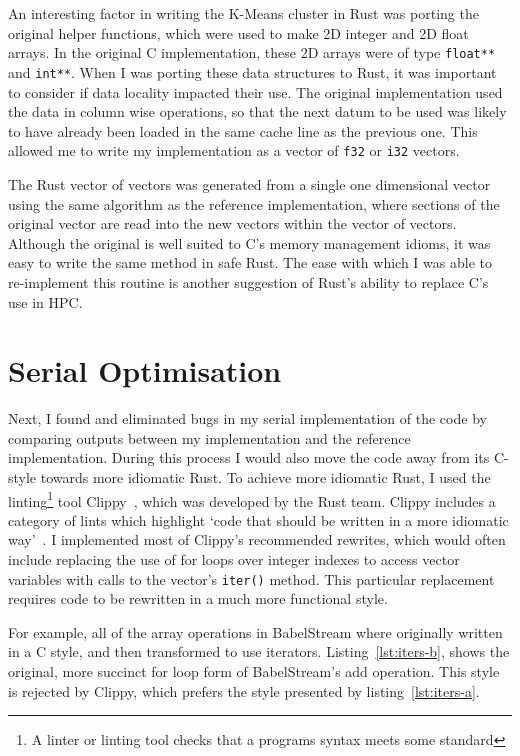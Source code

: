 An interesting factor in writing the K-Means cluster in Rust was porting the original helper functions, which were used to make 2D integer and 2D float arrays. In the original C implementation, these 2D arrays were of type \texttt{float**} and \texttt{int**}.
When I was porting these data structures to Rust, it was important to consider if data locality impacted their use. The original implementation used the data in column wise operations, so that the next datum to be used was likely to have already been loaded in the same cache line as the previous one. This allowed me to write my implementation as a vector of \texttt{f32} or \texttt{i32} vectors.

The Rust vector of vectors was generated from a single one dimensional vector using the same algorithm as the reference implementation, where sections of the original vector are read into the new vectors within the vector of vectors. Although the original is well suited to C's memory management idioms, it was easy to write the same method in safe Rust. The ease with which I was able to re-implement this routine is another suggestion of Rust's ability to replace C's use in HPC.

\section{Serial Optimisation}
Next, I found and eliminated bugs in my serial implementation of the code by comparing outputs between my implementation and the reference implementation. During this process I would also move the code away from its C-style towards more idiomatic Rust. To achieve more idiomatic Rust, I used the linting\footnote{A linter or linting tool checks that a programs syntax meets some standard} tool Clippy~\cite{RustClippy}, which was developed by the Rust team.  Clippy includes a category of lints  which highlight `code that should be written in a more idiomatic way'~\cite{RustClippy}. I implemented most of Clippy's recommended rewrites, which would often include replacing the use of for loops over integer indexes to access vector variables with calls to the vector's \texttt{iter()} method. This particular replacement requires code to be rewritten in a much more functional style.

For example, all of the array operations in BabelStream where originally written in a C style, and then transformed to use iterators. Listing~\ref{lst:iters-b}, shows the original, more succinct for loop form of BabelStream's add operation. This style is rejected by Clippy, which prefers the style presented by listing~\ref{lst:iters-a}.


